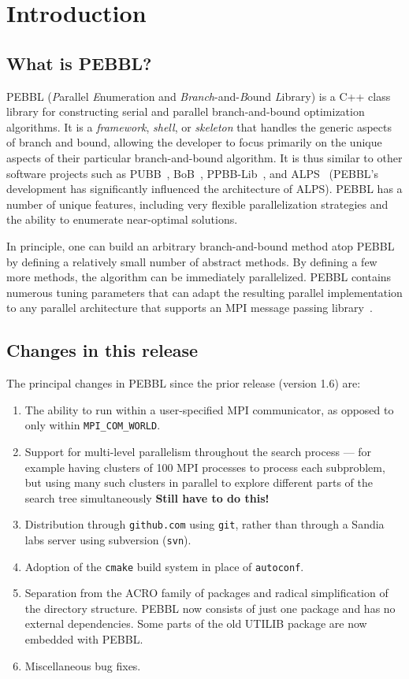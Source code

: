 \section{Introduction}


\subsection{What is PEBBL?}

PEBBL (\emph{P}arallel \emph{E}numeration and
\emph{Branch}-and-\emph{B}ound \emph{L}ibrary) is a C++ class library
for constructing serial and parallel branch-and-bound optimization
algorithms.  It is a \emph{framework}, \emph{shell}, or
\emph{skeleton} that handles the generic aspects of branch and bound,
allowing the developer to focus primarily on the unique aspects of
their particular branch-and-bound algorithm.  
It is thus similar to other software projects such
as PUBB~\cite{SHH95,SHH97}, BoB~\cite{bob95}, PPBB-Lib~\cite{PPBB96},
and ALPS~\cite{RLS04} (PEBBL's development has significantly
influenced the architecture of ALPS).  PEBBL has a number of unique
features, including very flexible parallelization strategies and the
ability to enumerate near-optimal solutions.

In principle, one can build an arbitrary branch-and-bound method atop
PEBBL by defining a relatively small number of abstract methods.  By
defining a few more methods, the algorithm can be immediately
parallelized.  PEBBL contains numerous tuning parameters that can
adapt the resulting parallel implementation to any parallel
architecture that supports an MPI message passing
library~\cite{SOHWD96}.


\subsection{Changes in this release}
The principal changes in PEBBL since the prior release (version 1.6) are:
\begin{enumerate}
\item The ability to run within a user-specified MPI communicator, as opposed
to only within \texttt{MPI\_COM\_WORLD}.
\item Support for multi-level parallelism throughout the search process ---
for example having clusters of 100 MPI processes to process each subproblem,
but using many such clusters in parallel to explore different parts of the
search tree simultaneously \textbf{Still have to do this!}
\item Distribution through \texttt{github.com} using \texttt{git}, rather than
through a Sandia labs server using subversion (\texttt{svn}).
\item Adoption of the \texttt{cmake} build system in place of \texttt{autoconf}.
\item Separation from the ACRO family of packages and radical simplification
of the directory structure.  PEBBL now consists of just one package and has no
external dependencies.  Some parts of the old UTILIB package are now embedded
with PEBBL.
\item Miscellaneous bug fixes.
\end{enumerate}


